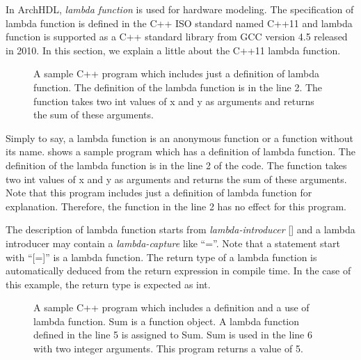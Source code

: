 In ArchHDL, \textit{lambda function} is used for hardware modeling.
The specification of lambda function is defined in the C++ ISO standard
named C++11 and
lambda function is supported as a C++ standard library from GCC version 4.5
released in 2010.
In this section,
we explain a little about the C++11 lambda function.

\begin{figure}[t]
 
\caption{A sample C++ program which includes just a definition of lambda function.
The definition of the lambda function is in the line 2.
The function takes two int values of x and y as arguments and returns the sum of these arguments.}
 \label{src:def_lambda1}
\end{figure}

Simply to say, a lambda function is an anonymous function or
a function without its name.
 shows
a sample program which has a definition of lambda function.
The definition of the lambda function is in the line 2 of the code.
The function takes two int values of x and y as arguments
and returns the sum of these arguments.
Note that this program includes just a definition of lambda function
for explanation.
Therefore, the function in the line 2 has no effect for this program.

The description of lambda function starts from \textit{lambda-introducer} []
and a lambda introducer may contain a \textit{lambda-capture} like ``=''.
Note that a statement start with ``[=]'' is a lambda function.
The return type of a lambda function is automatically deduced from
the return expression in compile time.
In the case of this example, the return type is expected as int.

\begin{figure}[t]
 
 \caption{
A sample C++ program which includes a definition and a use of lambda function.
Sum is a function object. A lambda function defined in the line 5 is
assigned to Sum. Sum is used in the line 6 with two integer arguments.
This program returns a value of 5.}
 \label{src:lambda2}
\end{figure}

